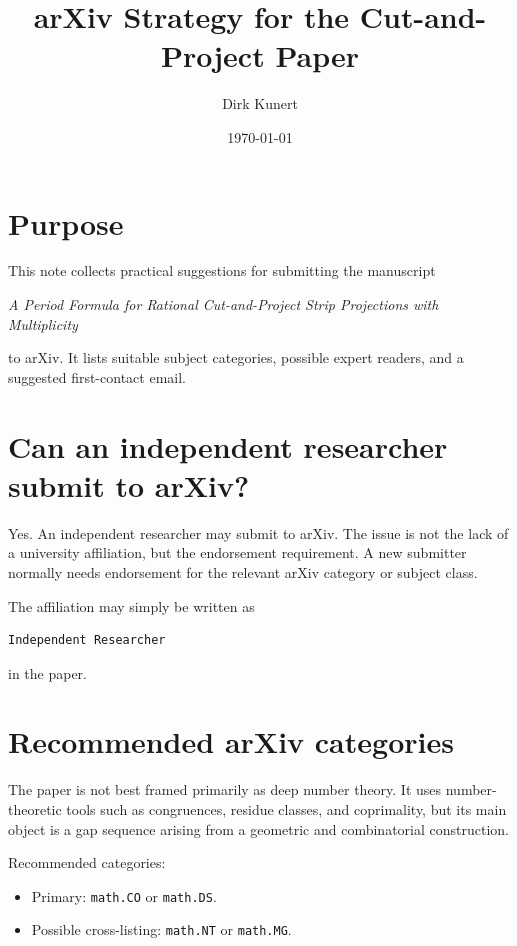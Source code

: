 \documentclass[11pt]{article}
\title{arXiv Strategy for the Cut-and-Project Paper}
\author{Dirk Kunert}
\date{\today}
\begin{document}
\maketitle

\section*{Purpose}

This note collects practical suggestions for submitting the manuscript

\begin{center}
\emph{A Period Formula for Rational Cut-and-Project Strip Projections
with Multiplicity}
\end{center}

to arXiv.  It lists suitable subject categories, possible expert readers,
and a suggested first-contact email.

\section*{Can an independent researcher submit to arXiv?}

Yes.  An independent researcher may submit to arXiv.  The issue is not the
lack of a university affiliation, but the endorsement requirement.  A new
submitter normally needs endorsement for the relevant arXiv category or
subject class.

The affiliation may simply be written as

\begin{verbatim}
Independent Researcher
\end{verbatim}

in the paper.

\section*{Recommended arXiv categories}

The paper is not best framed primarily as deep number theory.  It uses
number-theoretic tools such as congruences, residue classes, and coprimality,
but its main object is a gap sequence arising from a geometric and
combinatorial construction.

Recommended categories:

\begin{itemize}
    \item Primary: \texttt{math.CO} or \texttt{math.DS}.
    \item Possible cross-listing: \texttt{math.NT} or \texttt{math.MG}.
\end{itemize}
\end{document}
